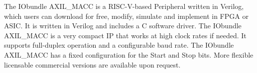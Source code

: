 The IObundle AXIL_MACC is a RISC-V-based Peripheral written in Verilog, which users can download for free, modify, simulate and implement in FPGA or ASIC. It is written in Verilog and includes a C software driver. The IObundle AXIL_MACC is a very compact IP that works at high clock rates if needed. It supports full-duplex operation and a configurable baud rate. The IObundle AXIL_MACC has a fixed configuration for the Start and Stop bits. More flexible licensable commercial versions are available upon request.